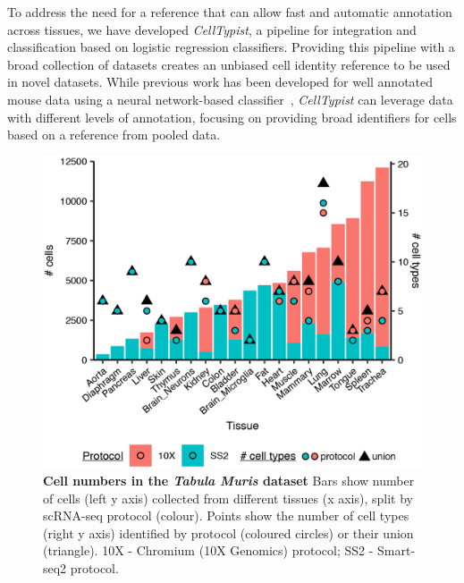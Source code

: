 To address the need for a reference that can allow fast and automatic annotation across tissues, we have developed \textit{CellTypist}, a pipeline for integration and classification based on logistic regression classifiers. Providing this pipeline with a broad collection of datasets creates an unbiased cell identity reference to be used in novel datasets. While previous work has been developed for well annotated mouse data  using a neural network-based classifier~\citep{alavi_web_2018}, \textit{CellTypist} can leverage data with different levels of annotation, focusing on providing broad identifiers for cells based on a reference from pooled data.

\begin{figure}[ht!]
    \centering    
    \includegraphics[width=1.0\textwidth]{Chapter3/Figs/countsCTCells_TabulaMuris.png} %
    \caption[Cell numbers in the \textit{Tabula Muris} dataset]{\textbf{Cell numbers in the \textit{Tabula Muris} dataset} \newline Bars show number of cells (left y axis) collected from different tissues (x axis), split by scRNA-seq protocol (colour). Points show the number of cell types (right y axis) identified by protocol (coloured circles) or their union (triangle). 10X - Chromium (10X Genomics) protocol; SS2 - Smart-seq2 protocol.}
    \label{fig:chap3_tmcounts}
\end{figure}

